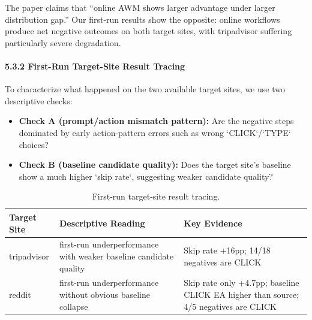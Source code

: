 \documentclass{article}
\providecommand{\tightlist}{%
  \setlength{\itemsep}{0pt}\setlength{\parskip}{0.8em}}
\begin{document}
The paper claims that ``online AWM shows larger advantage under larger
distribution gap.'' Our first-run results show the opposite: online
workflows produce net negative outcomes on both target sites, with
tripadvisor suffering particularly severe degradation.

\paragraph{5.3.2 First-Run Target-Site Result
Tracing}\label{cross-site-degradation-diagnosis}

To characterize what happened on the two available target sites, we use
two descriptive checks:

\begin{itemize}
\tightlist
\item
  \textbf{Check A (prompt/action mismatch pattern):} Are the negative
  steps dominated by early action-pattern errors such as wrong
  `CLICK`/`TYPE` choices?
\item
  \textbf{Check B (baseline candidate quality):} Does the target site's
  baseline show a much higher `skip rate`, suggesting weaker candidate
  quality?
\end{itemize}

{\begin{longtable}[]{@{}
  >{\raggedright\arraybackslash}p{}
  >{\raggedright\arraybackslash}p{}
  >{\raggedright\arraybackslash}p{}@{}}
\caption{First-run target-site result tracing.}\label{tab:cross-site-degradation-diagnosis}\\

\toprule\noalign{}
\begin{minipage}[b]{\linewidth}\raggedright
Target Site
\end{minipage} & \begin{minipage}[b]{\linewidth}\raggedright
Descriptive Reading
\end{minipage} & \begin{minipage}[b]{\linewidth}\raggedright
Key Evidence
\end{minipage} \\
\midrule\noalign{}
\endhead
\bottomrule\noalign{}
\endlastfoot
tripadvisor & first-run underperformance with weaker baseline candidate
quality & Skip rate +16pp; 14/18 negatives are CLICK \\
reddit & first-run underperformance without obvious baseline collapse &
Skip rate only +4.7pp; baseline CLICK EA higher than source; 4/5 negatives are CLICK \\
\end{longtable}
}
\end{document}
